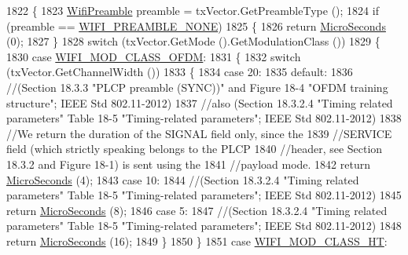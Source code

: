 \begin{DoxyCode}
1822 \{
1823   \hyperlink{group__wifi_ga5e94a56cb338a14ffbbb19c6a41251eb}{WifiPreamble} preamble = txVector.GetPreambleType ();
1824   \textcolor{keywordflow}{if} (preamble == \hyperlink{group__wifi_gga5e94a56cb338a14ffbbb19c6a41251eba97c5c71995de5f28931200e6d5a38a66}{WIFI\_PREAMBLE\_NONE})
1825     \{
1826       \textcolor{keywordflow}{return} \hyperlink{group__timecivil_ga17465a639c8d1464e76538afdd78a9f0}{MicroSeconds} (0);
1827     \}
1828   \textcolor{keywordflow}{switch} (txVector.GetMode ().GetModulationClass ())
1829     \{
1830     \textcolor{keywordflow}{case} \hyperlink{namespacens3_aa999e1221606a2b21b1eb33c2007c217a30a83a0318357c9611f09e6faadc8006}{WIFI\_MOD\_CLASS\_OFDM}:
1831       \{
1832         \textcolor{keywordflow}{switch} (txVector.GetChannelWidth ())
1833           \{
1834           \textcolor{keywordflow}{case} 20:
1835           \textcolor{keywordflow}{default}:
1836             \textcolor{comment}{//(Section 18.3.3 "PLCP preamble (SYNC))" and Figure 18-4 "OFDM training structure"; IEEE Std
       802.11-2012)}
1837             \textcolor{comment}{//also (Section 18.3.2.4 "Timing related parameters" Table 18-5 "Timing-related parameters";
       IEEE Std 802.11-2012)}
1838             \textcolor{comment}{//We return the duration of the SIGNAL field only, since the}
1839             \textcolor{comment}{//SERVICE field (which strictly speaking belongs to the PLCP}
1840             \textcolor{comment}{//header, see Section 18.3.2 and Figure 18-1) is sent using the}
1841             \textcolor{comment}{//payload mode.}
1842             \textcolor{keywordflow}{return} \hyperlink{group__timecivil_ga17465a639c8d1464e76538afdd78a9f0}{MicroSeconds} (4);
1843           \textcolor{keywordflow}{case} 10:
1844             \textcolor{comment}{//(Section 18.3.2.4 "Timing related parameters" Table 18-5 "Timing-related parameters"; IEEE
       Std 802.11-2012)}
1845             \textcolor{keywordflow}{return} \hyperlink{group__timecivil_ga17465a639c8d1464e76538afdd78a9f0}{MicroSeconds} (8);
1846           \textcolor{keywordflow}{case} 5:
1847             \textcolor{comment}{//(Section 18.3.2.4 "Timing related parameters" Table 18-5 "Timing-related parameters"; IEEE
       Std 802.11-2012)}
1848             \textcolor{keywordflow}{return} \hyperlink{group__timecivil_ga17465a639c8d1464e76538afdd78a9f0}{MicroSeconds} (16);
1849           \}
1850       \}
1851     \textcolor{keywordflow}{case} \hyperlink{namespacens3_aa999e1221606a2b21b1eb33c2007c217a6ac45cac36cc4454649435d24ebf349c}{WIFI\_MOD\_CLASS\_HT}:

\end{DoxyCode}

